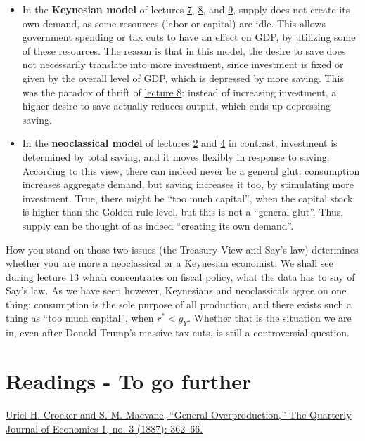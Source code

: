 \documentclass[]{book}
\theoremstyle{definition}
\theoremstyle{definition}
\theoremstyle{definition}
\theoremstyle{remark}
\begin{document}
\begin{itemize}
\item
  In the \textbf{Keynesian model} of lectures \href{lecture7.html}{7},
  \href{lecture8.html}{8}, and \href{lecture9.html}{9}, supply does not
  create its own demand, as some resources (labor or capital) are idle.
  This allows government spending or tax cuts to have an effect on GDP,
  by utilizing some of these resources. The reason is that in this
  model, the desire to save does not necessarily translate into more
  investment, since investment is fixed or given by the overall level of
  GDP, which is depressed by more saving. This was the paradox of thrift
  of \href{lecture8.html}{lecture 8}: instead of increasing investment,
  a higher desire to save actually reduces output, which ends up
  depressing saving.
\item
  In the \textbf{neoclassical model} of lectures \href{lecture2.html}{2}
  and \href{lecture4.html}{4} in contrast, investment is determined by
  total saving, and it moves flexibly in response to saving. According
  to this view, there can indeed never be a general glut: consumption
  increases aggregate demand, but saving increases it too, by
  stimulating more investment. True, there might be ``too much
  capital'', when the capital stock is higher than the Golden rule
  level, but this is not a ``general glut''. Thus, supply can be thought
  of as indeed ``creating its own demand''.
\end{itemize}

How you stand on those two issues (the Treasury View and Say's law)
determines whether you are more a neoclassical or a Keynesian economist.
We shall see during \href{lecture13.html}{lecture 13} which concentrates
on fiscal policy, what the data has to say of Say's law. As we have seen
however, Keynesians and neoclassicals agree on one thing: consumption is
the sole purpose of all production, and there exists such a thing as
``too much capital'', when \(r^{*}<g_Y\). Whether that is the situation
we are in, even after Donald Trump's massive tax cuts, is still a
controversial question.

\section*{Readings - To go further}\label{readings---to-go-further-7}

\href{https://doi.org/10.2307/1882763}{Uriel H. Crocker and S. M.
Macvane, ``General Overproduction,'' The Quarterly Journal of Economics
1, no. 3 (1887): 362--66.}
\end{document}
